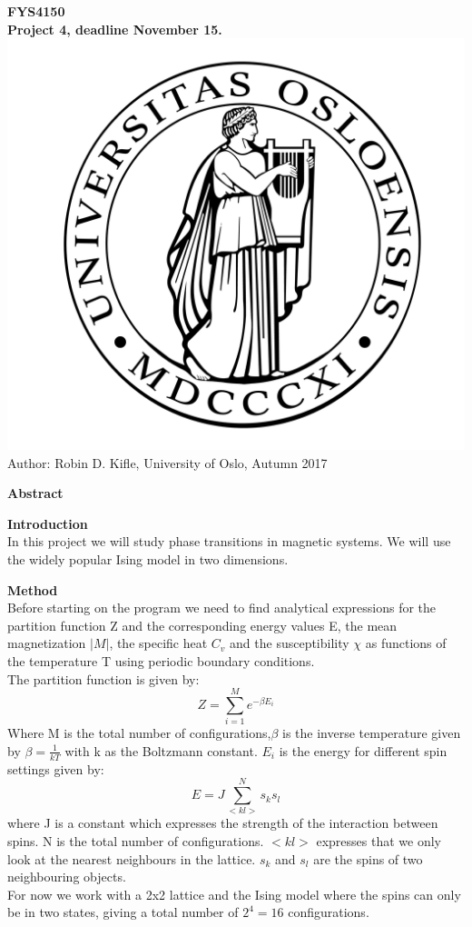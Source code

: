 \documentclass[10pt,a4paper]{article}
\begin{document}
\begin{center}
{\LARGE\bf
FYS4150\\
Project 4, deadline November 15.
}
 \includegraphics[scale=0.075]{uio.png}\\
Author: Robin D. Kifle,
University of Oslo, Autumn 2017

\vspace{3cm}
{\LARGE\bf
Abstract
}

\end{center}

\newpage

{\LARGE\bf
Introduction
}\\
In this project we will study phase transitions in magnetic systems. We will use the widely popular Ising model in two dimensions.\\
\newpage

{\LARGE\bf
Method
}\\
Before starting on the program we need to find analytical expressions for the partition function Z and the corresponding energy values E, the mean magnetization $|M|$, the specific heat $C_v$ and the susceptibility $\chi$ as functions of the temperature T using periodic boundary conditions.\\
The partition function is given by: $$Z = \sum\limits_{i=1}^{M}e^{-\beta E_i}$$
Where M is the total number of configurations,$\beta$ is the inverse temperature given by $\beta = \frac{1}{kT}$ with k as the Boltzmann constant. $E_i$ is the energy for different spin settings given by: $$E=J\sum\limits_{<kl>}^{N}s_ks_l$$ where J is a constant which expresses the strength of the interaction between spins. N is the total number of configurations.
 $<kl>$ expresses that we only look at the nearest neighbours in the lattice. $s_k$ and $s_l$ are the spins of two neighbouring objects. \\
 For now we work with a 2x2 lattice and the Ising model where the spins can only be in two states, giving a total number of $2^4=16$ configurations.
\end{document}
